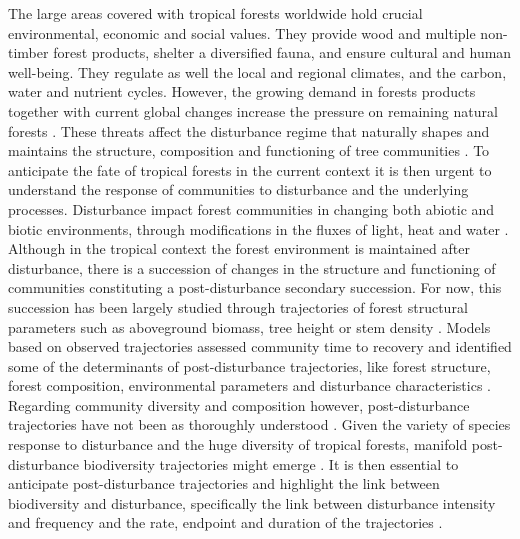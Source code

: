 \documentclass[fleqn,10pt]{ArtEcoFoG} %
\begin{document}
The large areas covered with tropical forests worldwide hold crucial
environmental, economic and social values. They provide wood and
multiple non-timber forest products, shelter a diversified fauna, and
ensure cultural and human well-being. They regulate as well the local
and regional climates, and the carbon, water and nutrient cycles.
However, the growing demand in forests products together with current
global changes increase the pressure on remaining natural forests
\citep{Morales-Hidalgo2015}. These threats affect the disturbance regime
that naturally shapes and maintains the structure, composition and
functioning of tree communities
\citep{Schnitzer2001, Anderson-Teixeira2013, Sist2015}. To anticipate
the fate of tropical forests in the current context it is then urgent to
understand the response of communities to disturbance and the underlying
processes. Disturbance impact forest communities in changing both
abiotic and biotic environments, through modifications in the fluxes of
light, heat and water \citep{Goulamoussene2017}. Although in the
tropical context the forest environment is maintained after disturbance,
there is a succession of changes in the structure and functioning of
communities constituting a post-disturbance secondary succession. For
now, this succession has been largely studied through trajectories of
forest structural parameters such as aboveground biomass, tree height or
stem density \citep{Piponiot2016, Rutishauser2016}. Models based on
observed trajectories assessed community time to recovery and identified
some of the determinants of post-disturbance trajectories, like forest
structure, forest composition, environmental parameters and disturbance
characteristics \citep{Herault2018}. Regarding community diversity and
composition however, post-disturbance trajectories have not been as
thoroughly understood \citep{Guitet2018, Molino2001}. Given the variety
of species response to disturbance and the huge diversity of tropical
forests, manifold post-disturbance biodiversity trajectories might
emerge \citep{Lindenmayer2012, Garcia_florez2017}. It is then essential
to anticipate post-disturbance trajectories and highlight the link
between biodiversity and disturbance, specifically the link between
disturbance intensity and frequency and the rate, endpoint and duration
of the trajectories \citep{Chazdon2003a, Willig2018}.
\end{document}
